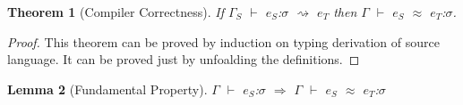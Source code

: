 \documentclass{article}
\newtheorem{theorem}{Theorem}[section]
\newtheorem{lemma}[theorem]{Lemma}
\begin{document}
\begin{theorem}[Compiler Correctness]
If $\Gamma_S$ $\vdash$ $e_S$:$\sigma$ $\rightsquigarrow$ $e_T$ then $\Gamma$ $\vdash$ $e_S$ $\approx$ $e_T$:$\sigma$.
\end{theorem}
\begin{proof}
This theorem can be proved by induction on typing derivation of source language. It can be proved just by unfoalding the definitions.
\end{proof}

\begin{lemma}[Fundamental Property]
$\Gamma$ $\vdash$ $e_S$:$\sigma$ $\Rightarrow$ $\Gamma$ $\vdash$ $e_S$ $\approx$ $e_T$:$\sigma$
\end{lemma}
\end{document}
